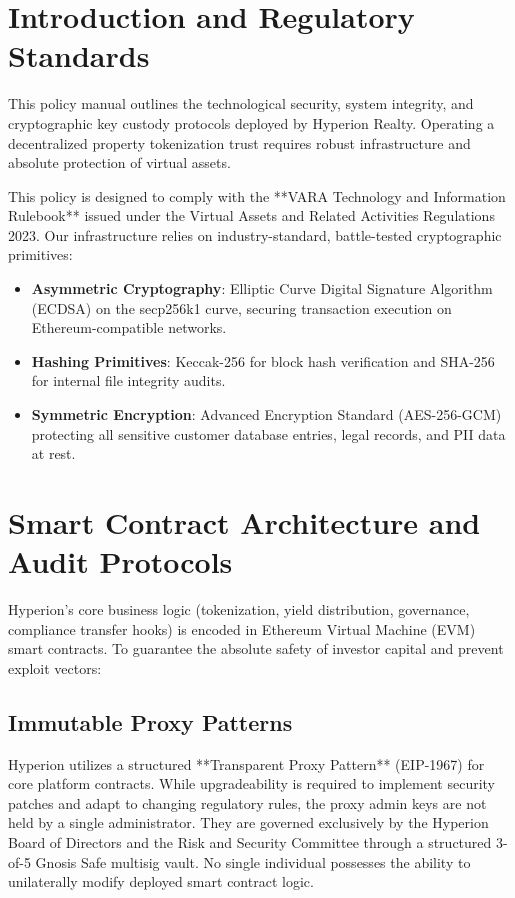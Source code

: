 \documentclass[11pt]{article}
\begin{document}

\newpage
{}
\tableofcontents
\newpage

\setcounter{page}{1}

\section{Introduction and Regulatory Standards}
This policy manual outlines the technological security, system integrity, and cryptographic key custody protocols deployed by Hyperion Realty. Operating a decentralized property tokenization trust requires robust infrastructure and absolute protection of virtual assets.

This policy is designed to comply with the **VARA Technology and Information Rulebook** issued under the Virtual Assets and Related Activities Regulations 2023. Our infrastructure relies on industry-standard, battle-tested cryptographic primitives:
\begin{itemize}
    \item \textbf{Asymmetric Cryptography}: Elliptic Curve Digital Signature Algorithm (ECDSA) on the secp256k1 curve, securing transaction execution on Ethereum-compatible networks.
    \item \textbf{Hashing Primitives}: Keccak-256 for block hash verification and SHA-256 for internal file integrity audits.
    \item \textbf{Symmetric Encryption}: Advanced Encryption Standard (AES-256-GCM) protecting all sensitive customer database entries, legal records, and PII data at rest.
\end{itemize}

\section{Smart Contract Architecture and Audit Protocols}
Hyperion's core business logic (tokenization, yield distribution, governance, compliance transfer hooks) is encoded in Ethereum Virtual Machine (EVM) smart contracts. To guarantee the absolute safety of investor capital and prevent exploit vectors:

\subsection{Immutable Proxy Patterns}
Hyperion utilizes a structured **Transparent Proxy Pattern** (EIP-1967) for core platform contracts. While upgradeability is required to implement security patches and adapt to changing regulatory rules, the proxy admin keys are not held by a single administrator. They are governed exclusively by the Hyperion Board of Directors and the Risk and Security Committee through a structured 3-of-5 Gnosis Safe multisig vault. No single individual possesses the ability to unilaterally modify deployed smart contract logic.
\end{document}
